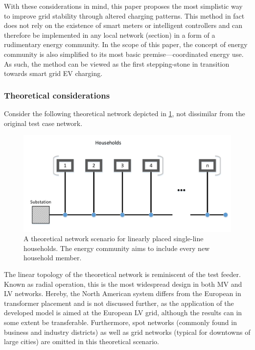 \documentclass[a4paper,10pt]{report}
\begin{document}
With these considerations in mind, this paper proposes the most simplistic way to improve grid stability through altered charging patterns. This method in fact does not rely on the existence of smart meters or intelligent controllers and can therefore be implemented in any local network (section) in a form of a rudimentary energy community. In the scope of this paper, the concept of energy community is also simplified to its most basic premise---coordinated energy use. As such, the method can be viewed as the first stepping-stone in transition towards smart grid EV charging. 

\subsubsection{Theoretical considerations}\label{subsubsection_theoretical_con}

Consider the following theoretical network depicted in \cref{comm_topology}, not dissimilar from the original test case network.

\begin{figure}[htpb]
	\centering
	\includegraphics[width=0.7\linewidth]{comm_topology}
	\caption[Theoretical energy community network scenario]{A theoretical network scenario for linearly placed single-line households. The energy community aims to include every new household member.}
	\label{comm_topology}
\end{figure}


The linear topology of the theoretical network is reminiscent of the test feeder. Known as radial operation, this is the most widespread design in both MV and LV networks. Hereby, the North American system differs from the European in transformer placement and is not discussed further, as the application of the developed model is aimed at the European LV grid, although the results can in some extent be transferable. Furthermore, spot networks (commonly found in business and industry districts) as well as grid networks (typical for downtowns of large cities) are omitted in this theoretical scenario.
\end{document}
